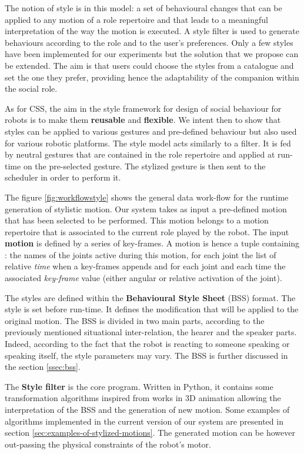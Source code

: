 \documentclass[a4paper,twocolumn]{svjour3}
\begin{document}
The notion of style is in this model: a set of behavioural changes that can be applied to any motion of a role repertoire and that leads to a meaningful interpretation of the way the motion is executed. 
A style filter is used to generate behaviours according to the role and to the user's preferences. 
Only a few styles have been implemented for our experiments but the solution that we propose can be extended.
The aim is that users could choose the styles from a catalogue and set the one they prefer, providing hence the adaptability of the companion within the social role. 

As for CSS, the aim in the style framework for design of social behaviour for robots is to make them \textbf{reusable }and \textbf{flexible}.
We intent then to show that styles can be applied to various gestures and pre-defined behaviour but also used for various robotic platforms. 
The style model acts similarly to a filter. 
It is fed by neutral gestures that are contained in the role repertoire and applied at run-time on the pre-selected gesture. 
The stylized gesture is then sent to the scheduler in order to perform it.

The figure \ref{fig:workflowstyle} shows the general data work-flow for the runtime generation of stylistic motion.
Our system takes as input a pre-defined motion that has been selected to be performed. 
This motion belongs to a motion repertoire that is associated to the current role played by the robot.
The input \textbf{motion} is defined by a series of key-frames.
A motion is hence a tuple containing : 
the names of the joints active during this motion,
for each joint the list of relative \textit{time} when a key-frames appends and for each joint and each time the associated \textit{key-frame} value (either angular or relative activation of the joint).

The styles are defined within the \textbf{Behavioural Style Sheet} (BSS) format. 
The style is set before run-time. 
It defines the modification that will be applied to the original motion.
The BSS is divided in two main parts, according to the previously mentioned situational inter-relation, the hearer and the speaker parts.
Indeed,  according to the fact that the robot is reacting to someone speaking or speaking itself, the style parameters may vary.
The BSS is further discussed in the section \ref{ssec:bss}.

The \textbf{Style filter} is the core program. 
Written in Python, it contains some transformation algorithms inspired from works in 3D animation allowing the interpretation of the BSS and the generation of new motion.
Some examples of algorithms implemented in the current version of our system are presented in section \ref{sec:examples-of-stylized-motions}.
The generated motion can be however out-passing the physical constraints of the robot's motor. 
\end{document}
